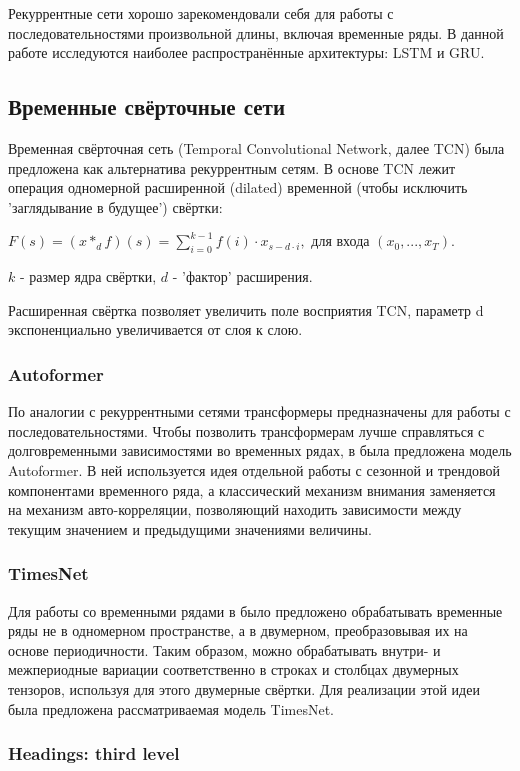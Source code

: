 \documentclass{article}
\begin{document}
Рекуррентные сети хорошо зарекомендовали себя для работы с последовательностями произвольной длины, включая временные ряды. В данной работе исследуются наиболее распространённые архитектуры: LSTM и GRU.

\subsection{Временные свёрточные сети}
Временная свёрточная сеть (Temporal Convolutional Network, далее TCN) была предложена как альтернатива рекуррентным сетям. В основе TCN лежит операция одномерной расширенной (dilated) временной (чтобы исключить 'заглядывание в будущее') свёртки: 

$F(s) = (x \ast_d f)(s) = \sum_{i=0}^{k - 1}f(i) \cdot x_{s - d \cdot i},$ для входа $(x_0, ..., x_T).$

$k$ - размер ядра свёртки, $d$ - 'фактор' расширения.

Расширенная свёртка позволяет увеличить поле восприятия TCN, параметр d экспоненциально увеличивается от слоя к слою.

\subsubsection{Autoformer}
По аналогии с рекуррентными сетями трансформеры предназначены для работы с последовательностями. Чтобы позволить трансформерам лучше справляться с долговременными зависимостями во временных рядах, в была предложена модель Autoformer. В ней используется идея отдельной работы с сезонной и трендовой компонентами временного ряда, а классический механизм внимания заменяется на механизм авто-корреляции, позволяющий находить зависимости между текущим значением и предыдущими значениями величины.

\subsubsection{TimesNet}
Для работы со временными рядами в было предложено обрабатывать временные ряды не в одномерном пространстве, а в двумерном, преобразовывая их на основе периодичности. Таким образом, можно обрабатывать внутри- и межпериодные вариации соответственно в строках и столбцах двумерных тензоров, используя для этого двумерные свёртки. Для реализации этой идеи была предложена рассматриваемая модель TimesNet.


\subsubsection{Headings: third level}
\lipsum[6]
\end{document}
